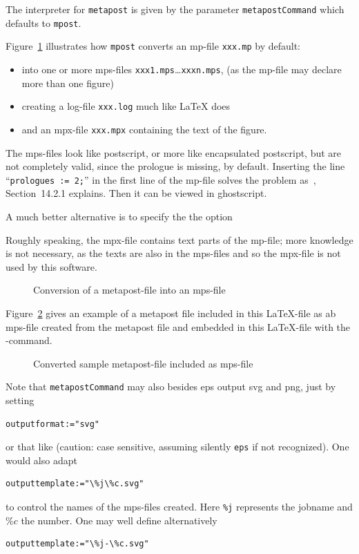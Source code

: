 \documentclass[12pt]{book}
\newcommand{\gls}[1]{#1}
\begin{document}
The interpreter for \texttt{metapost} 
is given by the parameter \texttt{metapostCommand} 
which defaults to \texttt{mpost}. 


Figure~\ref{fig:mp2mps} illustrates 
how \texttt{mpost} converts an \gls{mp}-file \texttt{xxx.mp} by default: 
%
\begin{itemize}
\item
into one or more \gls{mps}-files \texttt{xxx1.mps}\dots \texttt{xxxn.mps}, 
(as the mp-file may declare more than one figure) 
\item
creating a log-file \texttt{xxx.log} much like \LaTeX{} does 
\item
and an \gls{mpx}-file \texttt{xxx.mpx} containing the text of the figure. 
\end{itemize}

The mps-files look like postscript, or more like encapsulated postscript, 
but are not completely valid, since the prologue is missing, by default. 
Inserting the line ``\texttt{prologues\ :=\ 2;}'' %
in the first line of the mp-file 
solves the problem as~\cite{MPost}, Section~14.2.1 explains. 
Then it can be viewed in ghostscript. 

A much better alternative is to specify the the option 


Roughly speaking, the mpx-file contains text parts of the mp-file; 
more knowledge is not necessary, as the texts are also in the mps-files 
and so the mpx-file is not used by this software. 

\begin{figure}[htb]
\centering
{}
\caption{\label{fig:mp2mps}Conversion of a metapost-file into an mps-file}
\end{figure}


Figure~\ref{fig:metapost} gives an example of a metapost file 
included in this \LaTeX-file as ab mps-file 
created from the metapost file 
and embedded in this \LaTeX-file 
with the -command. 

\begin{figure}[htb]
\centering
{}
\caption{\label{fig:metapost}
Converted sample metapost-file included as mps-file  }
\end{figure}

Note that \texttt{metapostCommand} may also besides \gls{eps} 
output \gls{svg} and \gls{png}, 
just by setting 
%
\begin{verbatim}
outputformat:="svg" 
\end{verbatim}
%
or that like 
(caution: case sensitive, assuming silently \texttt{eps} if not recognized). 
One would also adapt 
%
\begin{verbatim}
outputtemplate:="\%j\%c.svg"
\end{verbatim}
%
to control the names of the mps-files created. 
Here \texttt{\%j} represents the jobname and $\%c$ the number. 
One may well define alternatively 
%
\begin{verbatim}
outputtemplate:="\%j-\%c.svg"
\end{verbatim}
\end{document}
